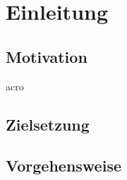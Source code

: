 \chapter{Einleitung} %

\section{Motivation}
\ac{acro}

\section{Zielsetzung}

\section{Vorgehensweise}